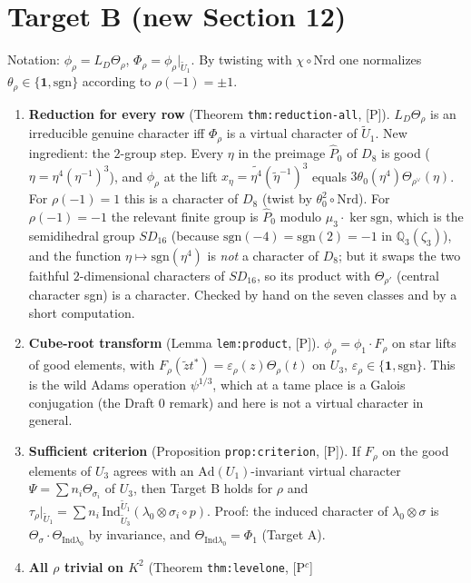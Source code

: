 \documentclass[11pt]{article}
\newcommand{\Q}{\mathbb Q}
\begin{document}
\section*{Target B (new Section 12)}
Notation: $\phi_\rho=L_D\Theta_\rho$, $\Phi_\rho=\phi_\rho|_{\tilde U_1}$.
By twisting with $\chi\circ\mathrm{Nrd}$ one normalizes
$\theta_\rho\in\{\mathbf 1,\mathrm{sgn}\}$ according to $\rho(-1)=\pm1$.
\begin{enumerate}[leftmargin=*]
\item \textbf{Reduction for every row} (Theorem \texttt{thm:reduction-all}, [P]).
$L_D\Theta_\rho$ is an irreducible genuine character iff $\Phi_\rho$ is a
virtual character of $\tilde U_1$.  New ingredient: the $2$-group step.
Every $\eta$ in the preimage $\hat P_0$ of $D_8$ is good
($\eta=\eta^4(\eta^{-1})^3$), and $\phi_\rho$ at the lift
$x_\eta=\widetilde{\eta^4}(\tilde\eta^{-1})^3$ equals
$3\theta_0(\eta^4)\Theta_{\rho^\vee}(\eta)$.  For $\rho(-1)=1$ this is a
character of $D_8$ (twist by $\theta_0^2\circ\mathrm{Nrd}$).  For
$\rho(-1)=-1$ the relevant finite group is $\hat P_0$ modulo
$\mu_3\cdot\ker\mathrm{sgn}$, which is the semidihedral group $SD_{16}$
(because $\mathrm{sgn}(-4)=\mathrm{sgn}(2)=-1$ in $\Q_3(\zeta_3)$), and
the function $\eta\mapsto\mathrm{sgn}(\eta^4)$ is \emph{not} a character
of $D_8$; but it swaps the two faithful $2$-dimensional characters of
$SD_{16}$, so its product with $\Theta_{\rho'}$ (central character sgn) is
a character.  Checked by hand on the seven classes and by a short
computation.
\item \textbf{Cube-root transform} (Lemma \texttt{lem:product}, [P]).
$\phi_\rho=\phi_1\cdot F_\rho$ on star lifts of good elements, with
$F_\rho(\tilde zt^*)=\varepsilon_\rho(z)\Theta_\rho(t)$ on $U_3$,
$\varepsilon_\rho\in\{\mathbf1,\mathrm{sgn}\}$.  This is the wild Adams
operation $\psi^{1/3}$, which at a tame place is a Galois conjugation
(the Draft 0 remark) and here is not a virtual character in general.
\item \textbf{Sufficient criterion} (Proposition \texttt{prop:criterion}, [P]).
If $F_\rho$ on the good elements of $U_3$ agrees with an
$\mathrm{Ad}(U_1)$-invariant virtual character $\Psi=\sum n_i\Theta_{\sigma_i}$
of $U_3$, then Target B holds for $\rho$ and
$\tau_\rho|_{\tilde U_1}=\sum n_i\,\mathrm{Ind}_{\tilde U_3}^{\tilde U_1}(\lambda_0\otimes\sigma_i\circ p)$.
Proof: the induced character of $\lambda_0\otimes\sigma$ is
$\Theta_\sigma\cdot\Theta_{\mathrm{Ind}\lambda_0}$ by invariance, and
$\Theta_{\mathrm{Ind}\lambda_0}=\Phi_1$ (Target A).
\item \textbf{All $\rho$ trivial on $K^2$} (Theorem \texttt{thm:levelone}, [P$^c$]

\end{enumerate}
\end{document}
